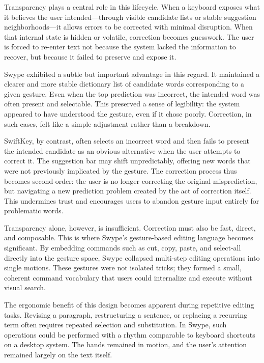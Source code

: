 \documentclass[11pt]{article}
\begin{document}
Transparency plays a central role in this lifecycle. When a keyboard exposes what it believes the user intended—through visible candidate lists or stable suggestion neighborhoods—it allows errors to be corrected with minimal disruption. When that internal state is hidden or volatile, correction becomes guesswork. The user is forced to re-enter text not because the system lacked the information to recover, but because it failed to preserve and expose it.

Swype exhibited a subtle but important advantage in this regard. It maintained a clearer and more stable dictionary list of candidate words corresponding to a given gesture. Even when the top prediction was incorrect, the intended word was often present and selectable. This preserved a sense of legibility: the system appeared to have understood the gesture, even if it chose poorly. Correction, in such cases, felt like a simple adjustment rather than a breakdown.

SwiftKey, by contrast, often selects an incorrect word and then fails to present the intended candidate as an obvious alternative when the user attempts to correct it. The suggestion bar may shift unpredictably, offering new words that were not previously implicated by the gesture. The correction process thus becomes second-order: the user is no longer correcting the original misprediction, but navigating a new prediction problem created by the act of correction itself. This undermines trust and encourages users to abandon gesture input entirely for problematic words.

Transparency alone, however, is insufficient. Correction must also be fast, direct, and composable. This is where Swype’s gesture-based editing language becomes significant. By embedding commands such as cut, copy, paste, and select-all directly into the gesture space, Swype collapsed multi-step editing operations into single motions. These gestures were not isolated tricks; they formed a small, coherent command vocabulary that users could internalize and execute without visual search.

The ergonomic benefit of this design becomes apparent during repetitive editing tasks. Revising a paragraph, restructuring a sentence, or replacing a recurring term often requires repeated selection and substitution. In Swype, such operations could be performed with a rhythm comparable to keyboard shortcuts on a desktop system. The hands remained in motion, and the user’s attention remained largely on the text itself.
\end{document}
